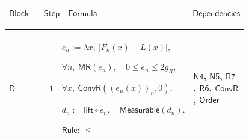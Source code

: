 \documentclass[12pt,reqno]{amsart}
\theoremstyle{blueplain}
\numberwithin{equation}{section}
\newlength{\DCTOneColumnBody}
\begin{document}
{\scriptsize {\ }}

{\scriptsize \setlength{\parskip}{0pt}\nointerlineskip
\noindent 
\begin{tabular}{|@{}>{\centering\arraybackslash}m{\DCTOneColumnBody}|}
\hline
$\displaystyle \mathsf{DCTProof}$ \\ \hline
\end{tabular}%
}

{\scriptsize \setlength{\parskip}{0pt}\nointerlineskip
\noindent 
\begin{tabular}{|@{}>{\centering\arraybackslash}m{0.10658\linewidth}|>{\centering\arraybackslash}m{0.03553\linewidth}|>{\centering\arraybackslash}m{0.52105\linewidth}|>{\centering\arraybackslash}m{0.23684\linewidth}|}
\hline
$\displaystyle \mathsf{Block}$ & $\displaystyle \mathsf{Step}$ & $%
\displaystyle \mathsf{Formula}$ & $\displaystyle \mathsf{Dependencies}$ \\ 
\hline
\end{tabular}%
}

{\scriptsize \setlength{\parskip}{0pt}\nointerlineskip
\noindent 
\begin{tabular}{|@{}>{\centering\arraybackslash}m{\DCTOneColumnBody}|}
\hline
$\displaystyle \mathsf{Context\_DCT}:=$\par$\displaystyle \mathsf{DCTHyp}%
(f,\ell,g),\quad g_R:=\lambda x,\ (g(x):\mathsf{Real}),$\par$\displaystyle %
N:=C^c\cup\bigcup_n B_n,\quad S:=X\setminus N,$\par$\displaystyle F_n:=f_n%
\mathbf{1}_S,\quad L:=\ell\mathbf{1}_S.$ \\ \hline
\end{tabular}%
}

{\scriptsize \setlength{\parskip}{0pt}\nointerlineskip
\noindent 
\begin{tabular}{|@{}>{\centering\arraybackslash}m{0.10658\linewidth}|>{\centering\arraybackslash}m{0.03553\linewidth}|>{\centering\arraybackslash}m{0.52105\linewidth}|>{\centering\arraybackslash}m{0.23684\linewidth}|}
\hline
\hypertarget{dct:D1}{$\displaystyle \mathsf{D}$} & $\displaystyle 1$ & $%
\displaystyle e_n:=\lambda x,\ |F_n(x)-L(x)|,$\par$\displaystyle \forall n,\ 
\mathsf{MR}(e_n),\quad0\le e_n\le2g_R,$\par$\displaystyle \forall x,\ 
\mathsf{ConvR}((e_n(x))_n,0),$\par$\displaystyle d_n:=\mathsf{lift}\circ
e_n,\quad\mathsf{Measurable}(d_n).$\par$\displaystyle \mathsf{Rule}:\ \le$ & 
\hyperlink{dct:N4}{$\displaystyle \mathsf{N4}$}, \hyperlink{dct:N5}{$%
\displaystyle \mathsf{N5}$}, \hyperlink{dct:R7}{$\displaystyle \mathsf{R7}$}%
, \hyperlink{dct:R6}{$\displaystyle \mathsf{R6}$}, \hyperlink{dctdef:ConvR}{$%
\displaystyle \mathsf{ConvR}$}, \hyperlink{ax:Order}{$\displaystyle \mathsf{%
Order}$} \\ \hline
\end{tabular}%
}
\end{document}
